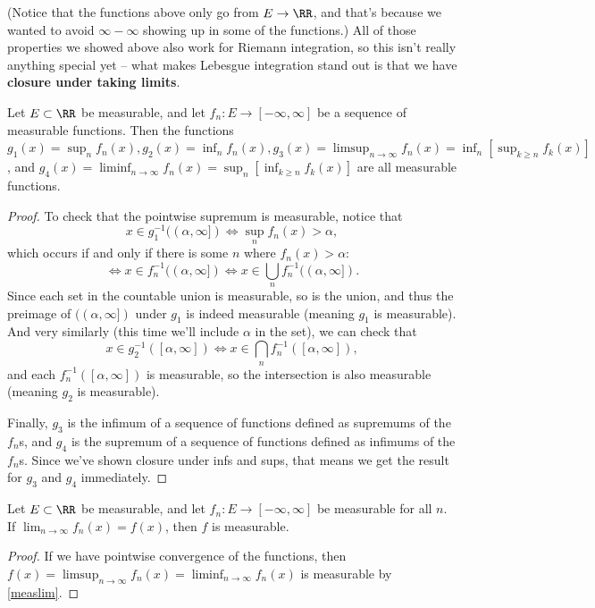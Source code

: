 (Notice that the functions above only go from $E \to \RR$, and that's because we wanted to avoid $\infty - \infty$ showing up in some of the functions.) All of those properties we showed above also work for Riemann integration, so this isn't really anything special yet -- what makes Lebesgue integration stand out is that we have \textbf{closure under taking limits}.

\begin{theorem}\label{measlim}
Let $E \subset \RR$ be measurable, and let $f_n: E \to [-\infty, \infty]$ be a sequence of measurable functions. Then the functions $g_1(x) = \sup_n f_n(x), g_2(x) = \inf_n f_n(x), g_3(x) = \limsup_{n \to \infty} f_n(x) = \inf_{n} \left[\sup_{k \ge n} f_k(x)\right]$, and $g_4(x) = \liminf_{n \to \infty} f_n(x) = \sup_n \left[\inf_{k \ge n} f_k(x) \right]$ are all measurable functions.
\end{theorem}
\begin{proof}
To check that the pointwise supremum is measurable, notice that
\[
    x \in g_1^{-1}((\alpha, \infty]) \iff \sup_n f_n(x) > \alpha,
\]
which occurs if and only if there is some $n$ where $f_n(x) > \alpha$: 
\[
    \iff x \in f_n^{-1}((\alpha, \infty]) \iff x \in \bigcup_n f_n^{-1}((\alpha, \infty]).
\]
Since each set in the countable union is measurable, so is the union, and thus the preimage of $((\alpha, \infty])$ under $g_1$ is indeed measurable (meaning $g_1$ is measurable). And very similarly (this time we'll include $\alpha$ in the set), we can check that
\[
    x \in g_2^{-1}([\alpha, \infty]) \iff x \in \bigcap_n f_n^{-1}([\alpha, \infty]),
\]
and each $f_n^{-1}([\alpha, \infty])$ is measurable, so the intersection is also measurable (meaning $g_2$ is measurable).

Finally, $g_3$ is the infimum of a sequence of functions defined as supremums of the $f_n$s, and $g_4$ is the supremum of a sequence of functions defined as infimums of the $f_n$s. Since we've shown closure under infs and sups, that means we get the result for $g_3$ and $g_4$ immediately.
\end{proof}

\begin{corollary}
Let $E \subset \RR$ be measurable, and let $f_n: E \to [-\infty, \infty]$ be measurable for all $n$. If $\lim_{n \to \infty} f_n(x) = f(x)$, then $f$ is measurable.
\end{corollary}
\begin{proof}
If we have pointwise convergence of the functions, then $f(x) = \limsup_{n \to \infty} f_n(x) = \liminf_{n \to \infty} f_n(x)$ is measurable by \cref{measlim}.
\end{proof}

